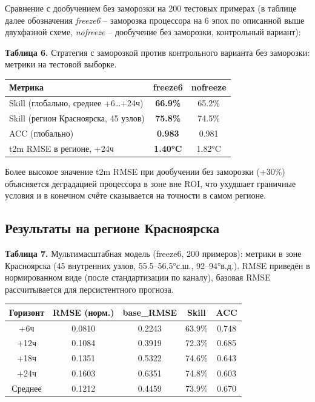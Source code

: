 \documentclass[14pt,a4paper]{extarticle}
\newcounter{none}
\numberwithin{table}{section}
\numberwithin{figure}{section}
\numberwithin{equation}{section}
\begin{document}
Сравнение с дообучением без заморозки на 200 тестовых
примерах (в таблице далее обозначения \textit{freeze6} -- заморозка процессора
на 6 эпох по описанной выше двухфазной схеме, \textit{nofreeze} -- дообучение
без заморозки, контрольный вариант):

\textbf{Таблица 6.} Стратегия с заморозкой против контрольного варианта без
заморозки: метрики на тестовой выборке.

{\def\LTcaptype{none} %
\begin{longtable}[]{@{}lcc@{}}
\toprule\noalign{}
Метрика & freeze6 & nofreeze \\
\midrule\noalign{}
\endhead
\bottomrule\noalign{}
\endlastfoot
Skill (глобально, среднее +6\ldots+24ч) & \textbf{66.9\%} & 65.2\% \\
Skill (регион Красноярска, 45 узлов) & \textbf{75.8\%} & 74.5\% \\
ACC (глобально) & \textbf{0.983} & 0.981 \\
t2m RMSE в регионе, +24ч & \textbf{1.40°C} & 1.82°C \\
\end{longtable}
}

Более высокое значение t2m RMSE при дообучении без заморозки (+30\%) объясняется
деградацией процессора в зоне вне ROI, что ухудшает граничные условия и в
конечном счёте сказывается на точности в самом регионе.

\subsection{Результаты на регионе Красноярска}\label{ux440ux435ux437ux443ux43bux44cux442ux430ux442ux44b-ux43dux430-ux440ux435ux433ux438ux43eux43dux435-ux43aux440ux430ux441ux43dux43eux44fux440ux441ux43aux430}

\textbf{Таблица 7.} Мультимасштабная модель (freeze6, 200
примеров): метрики в зоне Красноярска (45 внутренних узлов,
55.5--56.5°с.ш., 92--94°в.д.). RMSE приведён в нормированном виде
(после стандартизации по каналу), базовая RMSE рассчитывается для
персистентного прогноза.

{\def\LTcaptype{none} %
\begin{longtable}[]{@{}ccccc@{}}
\toprule\noalign{}
Горизонт & RMSE (норм.) & base\_RMSE & Skill & ACC \\
\midrule\noalign{}
\endhead
\bottomrule\noalign{}
\endlastfoot
+6ч & 0.0810 & 0.2243 & 63.9\% & 0.748 \\
+12ч & 0.1084 & 0.3919 & 72.3\% & 0.685 \\
+18ч & 0.1351 & 0.5322 & 74.6\% & 0.643 \\
+24ч & 0.1603 & 0.6351 & 74.8\% & 0.603 \\
Среднее & 0.1212 & 0.4459 & 73.9\% & 0.670 \\
\end{longtable}
}
\end{document}
